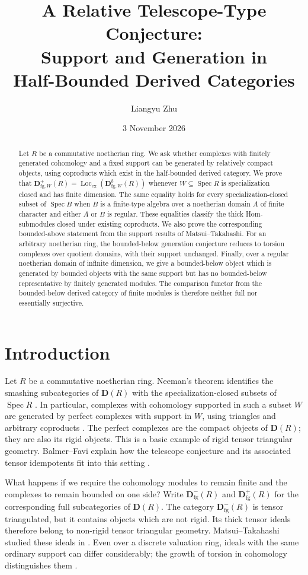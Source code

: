 \documentclass[11pt]{amsart}
\title[A relative telescope-type conjecture]{A Relative Telescope-Type Conjecture:\\[2pt]
Support and Generation in\\[2pt]
Half-Bounded Derived Categories}
\author{Liangyu Zhu}
\date{3 November 2026}
\numberwithin{equation}{section}
\theoremstyle{definition}
\theoremstyle{remark}
\DeclareMathOperator{\Spec}{Spec}
\DeclareMathOperator{\Loc}{Loc}
\newcommand{\D}{\mathbf D}
\newcommand{\fg}{\mathrm{fg}}
\begin{document}
\begin{abstract}
Let $R$ be a commutative noetherian ring. We ask whether complexes
with finitely generated cohomology and a fixed support can be
generated by relatively compact objects, using coproducts which
exist in the half-bounded derived category. We prove that
$\D^+_{\fg,W}(R)=\Loc_{\mathrm{ex}}(\D^b_{\fg,W}(R))$ whenever
$W\subseteq\Spec R$ is specialization closed and has finite
dimension. The same equality holds for every specialization-closed
subset of $\Spec B$ when $B$ is a finite-type algebra over a
noetherian domain $A$ of finite character and either $A$ or $B$
is regular. These equalities classify the thick Hom-submodules
closed under existing coproducts. We also prove the corresponding
bounded-above statement from the support results of
Matsui--Takahashi. For an arbitrary noetherian ring, the
bounded-below generation conjecture reduces to torsion complexes
over quotient domains, with their support unchanged. Finally,
over a regular noetherian domain of infinite dimension, we give
a bounded-below object which is generated by bounded objects
with the same support but has no bounded-below representative
by finitely generated modules. The comparison functor from the
bounded-below derived category of finite modules is therefore
neither full nor essentially surjective.
\end{abstract}
\maketitle

\section{Introduction}

Let $R$ be a commutative noetherian ring. Neeman's theorem identifies
the smashing subcategories of $\D(R)$ with the specialization-closed
subsets of $\Spec R$ \cite{Neeman92}. In particular, complexes with
cohomology supported in such a subset $W$ are generated by perfect
complexes with support in $W$, using triangles and arbitrary coproducts
\cite{Neeman92,BIK08}. The perfect complexes are the compact objects
of $\D(R)$; they are also its rigid objects. This is a basic example
of rigid tensor triangular geometry. Balmer--Favi explain how the
telescope conjecture and its associated tensor idempotents fit into
this setting \cite{BF11}.

What happens if we require the cohomology modules to remain finite
and the complexes to remain bounded on one side? Write
$\D^-_{\fg}(R)$ and $\D^+_{\fg}(R)$ for the corresponding full
subcategories of $\D(R)$. The category $\D^-_{\fg}(R)$ is tensor
triangulated, but it contains objects which are not rigid. Its thick
tensor ideals therefore belong to non-rigid tensor triangular
geometry. Matsui--Takahashi studied these ideals in \cite{MT17}.
Even over a discrete valuation ring, ideals with the same ordinary
support can differ considerably; the growth of torsion in cohomology
distinguishes them \cite{SZ26}.
\end{document}
